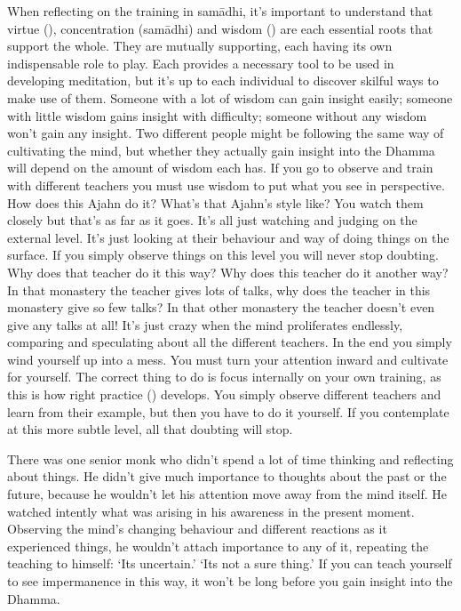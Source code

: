 When reflecting on the training in sam\=adhi, it's important to understand that virtue (), concentration (sam\=adhi) and wisdom () are each essential roots that support the whole. They are mutually supporting, each having its own indispensable role to play. Each provides a necessary tool to be used in developing meditation, but it's up to each individual to discover skilful ways to make use of them. Someone with a lot of wisdom can gain insight easily; someone with little wisdom gains insight with difficulty; someone without any wisdom won't gain any insight. Two different people might be following the same way of cultivating the mind, but whether they actually gain insight into the Dhamma will depend on the amount of wisdom each has. If you go to observe and train with different teachers you must use wisdom to put what you see in perspective. How does this Ajahn do it? What's that Ajahn's style like? You watch them closely but that's as far as it goes. It's all just watching and judging on the external level. It's just looking at their behaviour and way of doing things on the surface. If you simply observe things on this level you will never stop doubting. Why does that teacher do it this way? Why does this teacher do it another way? In that monastery the teacher gives lots of talks, why does the teacher in this monastery give so few talks? In that other monastery the teacher doesn't even give any talks at all! It's just crazy when the mind proliferates endlessly, comparing and speculating about all the different teachers. In the end you simply wind yourself up into a mess. You must turn your attention inward and cultivate for yourself. The correct thing to do is focus internally on your own training, as this is how right practice () develops. You simply observe different teachers and learn from their example, but then you have to do it yourself. If you contemplate at this more subtle level, all that doubting will stop.

There was one senior monk who didn't spend a lot of time thinking and reflecting about things. He didn't give much importance to thoughts about the past or the future, because he wouldn't let his attention move away from the mind itself. He watched intently what was arising in his awareness in the present moment. Observing the mind's changing behaviour and different reactions as it experienced things, he wouldn't attach importance to any of it, repeating the teaching to himself: `Its uncertain.' `Its not a sure thing.' If you can teach yourself to see impermanence in this way, it won't be long before you gain insight into the Dhamma.

